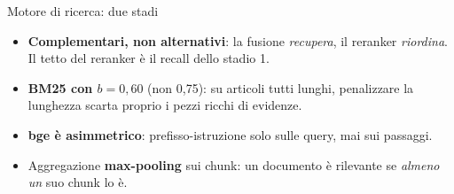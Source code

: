 \documentclass[aspectratio=169,11pt]{beamer}
\begin{document}
\begin{frame}{Motore di ricerca: due stadi}
  \centering
  \vspace{0.7em}
  \begin{itemize}\small
    \item \textbf{Complementari, non alternativi}: la fusione \emph{recupera}, il reranker
          \emph{riordina}. Il tetto del reranker è il recall dello stadio 1.
    \item \textbf{BM25 con $b = 0{,}60$} (non 0,75): su articoli tutti lunghi, penalizzare la
          lunghezza scarta proprio i pezzi ricchi di evidenze.
    \item \textbf{bge è asimmetrico}: prefisso-istruzione solo sulle query, mai sui passaggi.
    \item Aggregazione \textbf{max-pooling} sui chunk: un documento è rilevante se
          \emph{almeno un} suo chunk lo è.
  \end{itemize}
\end{frame}
\end{document}
